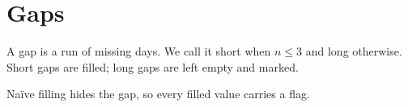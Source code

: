 \section{Gaps}
A gap is a run of missing days. We call it short when $n \le 3$ and long
otherwise. Short gaps are filled; long gaps are left empty and marked.

Naïve filling hides the gap, so every filled value carries a flag.
